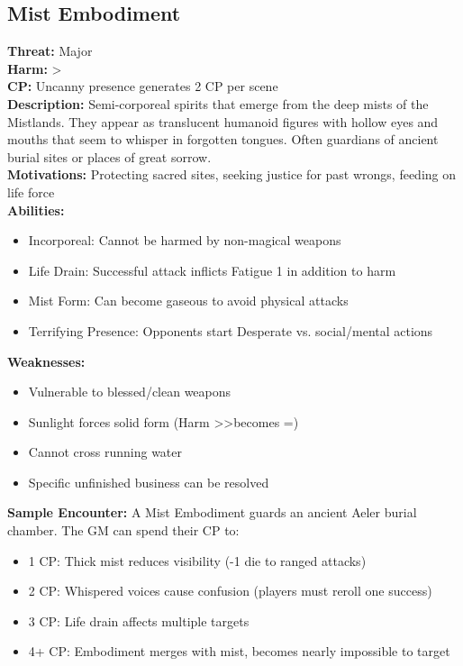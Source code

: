 \documentclass[11pt]{article}
\newenvironment{monsterentry}[1]{%
  \begin{mdframed}[backgroundcolor=shadecolor, linewidth=0pt, leftmargin=0pt, rightmargin=0pt]%
  \subsection*{#1}%
}{%
  \end{mdframed}%
}
\begin{document}
\begin{monsterentry}{Mist Embodiment}
\textbf{Threat:} Major \\
\textbf{Harm:} \textgreater \\
\textbf{CP:} Uncanny presence generates 2 CP per scene \\
\textbf{Description:} Semi-corporeal spirits that emerge from the deep mists of the Mistlands. They appear as translucent humanoid figures with hollow eyes and mouths that seem to whisper in forgotten tongues. Often guardians of ancient burial sites or places of great sorrow. \\
\textbf{Motivations:} Protecting sacred sites, seeking justice for past wrongs, feeding on life force \\
\textbf{Abilities:}
\begin{itemize}
    \item Incorporeal: Cannot be harmed by non-magical weapons
    \item Life Drain: Successful attack inflicts Fatigue 1 in addition to harm
    \item Mist Form: Can become gaseous to avoid physical attacks
    \item Terrifying Presence: Opponents start Desperate vs. social/mental actions
\end{itemize}
\textbf{Weaknesses:}
\begin{itemize}
    \item Vulnerable to blessed/clean weapons
    \item Sunlight forces solid form (Harm \textgreater\textgreater becomes =)
    \item Cannot cross running water
    \item Specific unfinished business can be resolved
\end{itemize}
\textbf{Sample Encounter:} A Mist Embodiment guards an ancient Aeler burial chamber. The GM can spend their CP to:
\begin{itemize}
    \item 1 CP: Thick mist reduces visibility (-1 die to ranged attacks)
    \item 2 CP: Whispered voices cause confusion (players must reroll one success)
    \item 3 CP: Life drain affects multiple targets
    \item 4+ CP: Embodiment merges with mist, becomes nearly impossible to target
\end{itemize}
\end{monsterentry}
\end{document}

